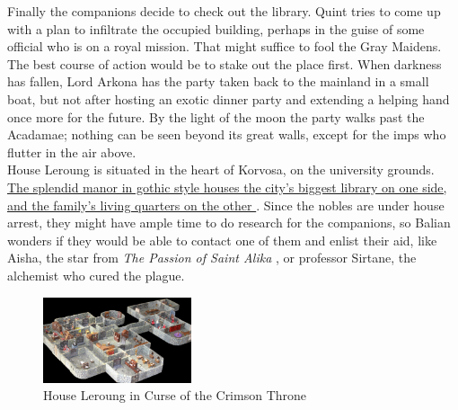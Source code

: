Finally the companions decide to check out the library. Quint tries to come up with a plan to infiltrate the occupied building, perhaps in the guise of some official who is on a royal mission. That might suffice to fool the Gray Maidens. The best course of action would be to stake out the place first. When darkness has fallen, Lord Arkona has the party taken back to the mainland in a small boat, but not after hosting an exotic dinner party and extending a helping hand once more for the future. By the light of the moon the party walks past the Acadamae; nothing can be seen beyond its great walls, except for the imps who flutter in the air above.\\

House Leroung is situated in the heart of Korvosa, on the university grounds.\hyperref[fig:House-Leroung-in-Curse-of-the-Crimson-Throne-607543444]{ The splendid manor in gothic style houses the city's biggest library on one side, and the family's living quarters on the other } . Since the nobles are under house arrest, they might have ample time to do research for the companions, so Balian wonders if they would be able to contact one of them and enlist their aid, like Aisha, the star from  {\itshape The Passion of Saint Alika} , or professor Sirtane, the alchemist who cured the plague. \\

\begin{figure}[h]
	\centering
	\includegraphics[width=0.39\textwidth]{images/House-Leroung-in-Curse-of-the-Crimson-Throne-607543444.jpg}
	\caption{House Leroung in Curse of the Crimson Throne}
	\label{fig:House-Leroung-in-Curse-of-the-Crimson-Throne-607543444}
\end{figure}

